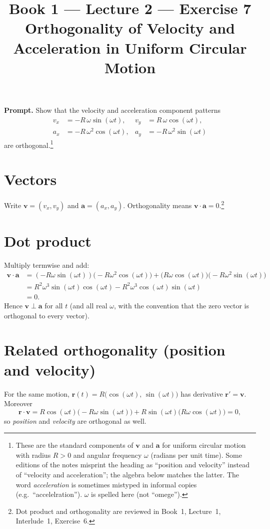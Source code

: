 \documentclass[11pt]{article}
\title{\textbf{Book 1 --- Lecture 2 --- Exercise 7}\\[2mm]
\large Orthogonality of Velocity and Acceleration in Uniform Circular Motion}
\author{}
\date{}
\newcommand{\promptbox}[1]{%
  \begin{savenotes}%
  \begingroup\setlength{\fboxsep}{10pt}\noindent
  \colorbox{blue!8}{\parbox{\dimexpr\linewidth-2\fboxsep\relax}{\textbf{Prompt. }#1}}
  \endgroup
  \end{savenotes}%
}
\begin{document}
\maketitle

\promptbox{Show that the velocity and acceleration component patterns
\begin{align*}
v_x &= -R\,\omega\sin(\omega t), &
v_y &= R\,\omega\cos(\omega t),\\
a_x &= -R\,\omega^2\cos(\omega t), &
a_y &= -R\,\omega^2\sin(\omega t)
\end{align*}
are orthogonal.\footnote{These are the standard components of \(\mathbf{v}\) and
\(\mathbf{a}\) for uniform circular motion with radius \(R>0\) and angular
frequency \(\omega\) (radians per unit time). Some editions of the notes
misprint the heading as ``position and velocity'' instead of ``velocity and
acceleration''; the algebra below matches the latter. The word
\emph{acceleration} is sometimes mistyped in informal copies (e.g.\
``accelelration''). \(\omega\) is spelled here (not ``omege'').}}

\section*{Vectors}
Write \(\mathbf{v}=(v_x,v_y)\) and \(\mathbf{a}=(a_x,a_y)\). Orthogonality means
\(\mathbf{v}\cdot\mathbf{a}=0\).\footnote{Dot product and orthogonality are
reviewed in Book~1, Lecture~1, Interlude~1, Exercise~6.}

\section*{Dot product}
Multiply termwise and add:
\begin{align*}
\mathbf{v}\cdot\mathbf{a}
&=(-R\omega\sin(\omega t))\bigl(-R\omega^2\cos(\omega t)\bigr)
+\bigl(R\omega\cos(\omega t)\bigr)\bigl(-R\omega^2\sin(\omega t)\bigr)\\
&=R^2\omega^3\sin(\omega t)\cos(\omega t)-R^2\omega^3\cos(\omega t)\sin(\omega t)\\
&=0.
\end{align*}
Hence \(\mathbf{v}\perp\mathbf{a}\) for all \(t\) (and all real \(\omega\), with
the convention that the zero vector is orthogonal to every vector).

\section*{Related orthogonality (position and velocity)}
For the same motion, \(\mathbf{r}(t)=R\bigl(\cos(\omega t),\,\sin(\omega t)\bigr)\)
has derivative \(\mathbf{r}'=\mathbf{v}\). Moreover
\[
\mathbf{r}\cdot\mathbf{v}
=R\cos(\omega t)\bigl(-R\omega\sin(\omega t)\bigr)
+R\sin(\omega t)\bigl(R\omega\cos(\omega t)\bigr)=0,
\]
so \emph{position} and \emph{velocity} are orthogonal as well.
\end{document}

